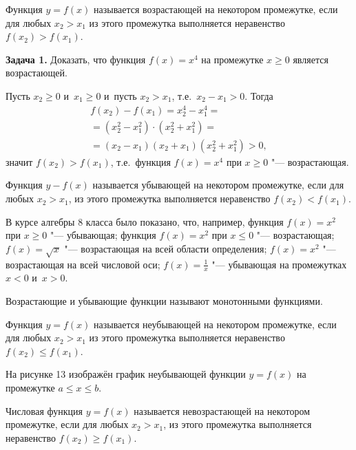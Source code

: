 \begin{Def}
Функция $y = f(x)$ называется возрастающей на некотором промежутке,
если для любых $x_{2} > x_{1}$ из этого промежутка выполняется
неравенство $f(x_{2}) > f(x_{1})$.
\end{Def}

\textbf{Задача 1.}
Доказать, что функция $f(x) = x^{4}$ на промежутке $x \geqslant 0$
является возрастающей.

Пусть $x_{2} \geqslant 0$ и~$x_{1} \geqslant 0$ и~пусть $x_{2} > x_{1}$,
т.е.\ $x_{2} - x_{1} > 0$.
Тогда
\begin{multline*}
f(x_{2}) - f(x_{1}) = x_{2}^{4} - x_{1}^{4} = \\
=(x_{2}^{2} - x_{1}^{2}) \cdot (x_{2}^{2} + x_{1}^{2}) = \\
= (x_{2} - x_{1})(x_{2} + x_{1})(x_{2}^{2} + x_{1}^{2}) > 0,
\end{multline*}
значит $f(x_{2}) > f(x_{1})$, т.е.\ функция $f(x) = x^{4}$
при $x \geqslant 0$ "--- возрастающая.

\begin{Def}
Функция $y - f(x)$ называется убывающей на некотором промежутке,
если для любых $x_{2} > x_{1}$, из этого промежутка выполняется неравенство
$f(x_{2}) < f(x_{1})$.
\end{Def}

В курсе алгебры 8 класса было показано, что, например,
функция $f(x) = x^{2}$ при $x \geqslant 0$ "--- убывающая;
функция $f(x) = x^{2}$ при $x \leqslant 0$ "--- возрастающая;
$f(x) = \sqrt{x}$ "--- возрастающая на всей области определения;
$f(x) = x^{2}$ "--- возрастающая на всей числовой оси;
$\displaystyle f(x) = \frac{1}{x}$ "--- убывающая на промежутках $x<0$ и~$x>0$.

Возрастающие и убывающие функции называют монотонными функциями.

\begin{Def}
Функция $y = f(x)$ называется неубывающей на некотором промежутке,
если для любых $x_{2} > x_{1}$ из этого промежутка выполняется
неравенство $f(x_{2}) \leqslant f(x_{1})$.
\end{Def}

На рисунке 13 изображён график неубывающей функции $y = f(x)$
на промежутке $a \leqslant x \leqslant b$.

\begin{Def}
Числовая функция $y = f(x)$ называется невозрастающей на некотором
промежутке, если для любых $x_{2} > x_{1}$, из этого промежутка
выполняется неравенство $f(x_{2}) \geqslant f(x_{1})$.
\end{Def}

